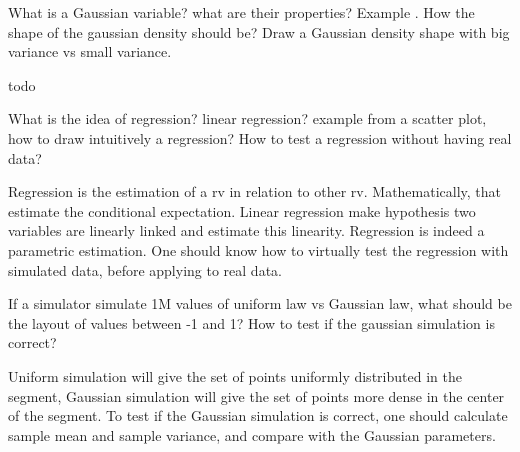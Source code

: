 \documentclass{exam}
\begin{document}
\begin{questions}
\question What is a Gaussian variable? what are their properties? Example . How the shape of the gaussian density should be?  Draw a Gaussian density shape with big variance vs small variance.
\begin{solution}[.2in]
	todo
\end{solution}

\question What is the idea of regression? linear regression? example from a scatter plot, how to draw intuitively a regression? How to test a regression without having real data?
\begin{solution}[.2in]
Regression is the estimation of a rv in relation to other rv. Mathematically, that estimate the conditional expectation. Linear regression make hypothesis two variables are linearly linked and estimate this linearity. Regression is indeed a parametric estimation. One should know how to virtually test the regression with simulated data, before applying to real data.
\end{solution}

\question If a simulator simulate 1M values of uniform law vs Gaussian law, what should be the layout of values between -1 and 1? How to test if the gaussian simulation is correct?
\begin{solution}[.2in]
Uniform simulation will give the set of points uniformly distributed in the segment, Gaussian simulation will give the set of points more dense in the center of the segment. To test if the Gaussian simulation is correct, one should calculate sample mean and sample variance, and compare with the Gaussian parameters.
\end{solution}
\end{questions}

\newpage
\end{document}
